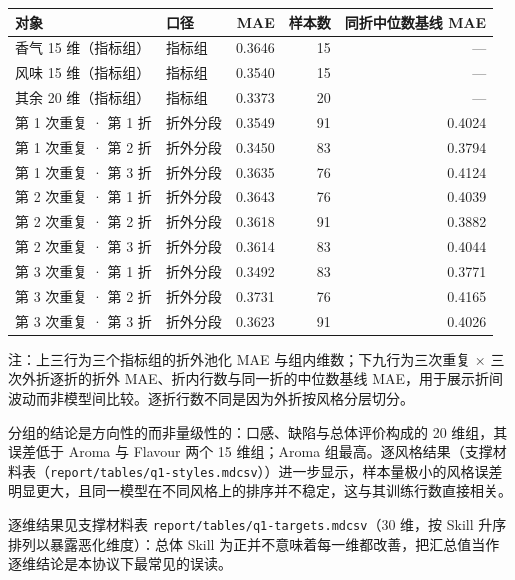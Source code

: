 \documentclass[11pt,a4paper]{article}
\newenvironment{bptable}{%
  \par\medskip\noindent\begin{minipage}{\linewidth}\centering
}{%
  \end{minipage}\par\medskip
}
\newenvironment{tablenote}{%
  \par\smallskip\noindent\footnotesize
  \setlength{\parindent}{0pt}\setlength{\parskip}{0pt}%
  \raggedright
}{%
  \par\medskip
}
\begin{document}
\begin{bptable}
\setcounter{table}{1}
\label{tab:q1-groups}
\par\smallskip
\small
\begin{tabular}{@{}llrrr@{}}
\toprule
对象 & 口径 & MAE & 样本数 & 同折中位数基线 MAE \\
\midrule
香气 15 维（指标组） & 指标组 & 0.3646 & 15 & — \\
风味 15 维（指标组） & 指标组 & 0.3540 & 15 & — \\
其余 20 维（指标组） & 指标组 & 0.3373 & 20 & — \\
第 1 次重复 ·\allowbreak{} 第 1 折 & 折外分段 & 0.3549 & 91 & 0.4024 \\
第 1 次重复 ·\allowbreak{} 第 2 折 & 折外分段 & 0.3450 & 83 & 0.3794 \\
第 1 次重复 ·\allowbreak{} 第 3 折 & 折外分段 & 0.3635 & 76 & 0.4124 \\
第 2 次重复 ·\allowbreak{} 第 1 折 & 折外分段 & 0.3643 & 76 & 0.4039 \\
第 2 次重复 ·\allowbreak{} 第 2 折 & 折外分段 & 0.3618 & 91 & 0.3882 \\
第 2 次重复 ·\allowbreak{} 第 3 折 & 折外分段 & 0.3614 & 83 & 0.4044 \\
第 3 次重复 ·\allowbreak{} 第 1 折 & 折外分段 & 0.3492 & 83 & 0.3771 \\
第 3 次重复 ·\allowbreak{} 第 2 折 & 折外分段 & 0.3731 & 76 & 0.4165 \\
第 3 次重复 ·\allowbreak{} 第 3 折 & 折外分段 & 0.3623 & 91 & 0.4026 \\
\bottomrule
\end{tabular}
\begin{tablenote}注：上三行为三个指标组的折外池化 MAE 与组内维数；下九行为三次重复 × 三次外折逐折的折外 MAE、折内行数与同一折的中位数基线 MAE，用于展示折间波动而非模型间比较。逐折行数不同是因为外折按风格分层切分。\end{tablenote}
\end{bptable}

分组的结论是方向性的而非量级性的：口感、缺陷与总体评价构成的 20
维组，其误差低于 Aroma 与 Flavour 两个 15 维组；Aroma
组最高。逐风格结果（支撑材料表（\texttt{report/tables/q1-styles.md\textbar{}csv}））进一步显示，样本量极小的风格误差明显更大，且同一模型在不同风格上的排序并不稳定，这与其训练行数直接相关。

逐维结果见支撑材料表
\texttt{report/tables/q1-targets.md\textbar{}csv}（30 维，按 Skill
升序排列以暴露恶化维度）：总体 Skill
为正并不意味着每一维都改善，把汇总值当作逐维结论是本协议下最常见的误读。
\end{document}
